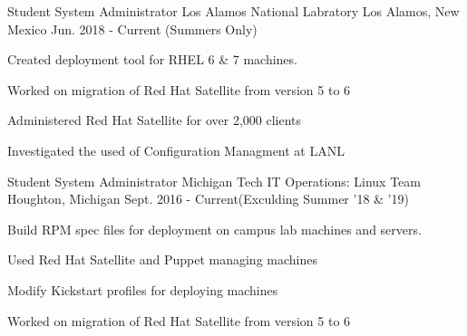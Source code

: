 

\begin{cventries}

  \cventry
    {Student System Administrator} %
    {Los Alamos National Labratory} %
    {Los Alamos, New Mexico} %
    {Jun. 2018 - Current (Summers Only)} %
    {
      \begin{cvitems} %
      \item {Created deployment tool for RHEL 6 \& 7 machines.}
        \item {Worked on migration of Red Hat Satellite from version 5 to 6}
        \item {Administered Red Hat Satellite for over 2,000 clients}
        \item {Investigated the used of Configuration Managment at LANL}
      \end{cvitems}
    }

  \cventry
    {Student System Administrator} %
    {Michigan Tech IT Operations: Linux Team} %
    {Houghton, Michigan} %
    {Sept. 2016 - Current(Exculding Summer '18 \& '19)} %
    {
      \begin{cvitems} %
        \item {Build RPM spec files for deployment on campus lab machines and servers.}
        \item {Used Red Hat Satellite and Puppet managing machines}
        \item {Modify Kickstart profiles for deploying machines}	
        \item {Worked on migration of Red Hat Satellite from version 5 to 6}
      \end{cvitems}
    }


\end{cventries}
